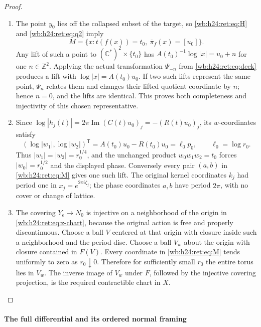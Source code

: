 \begin{proof}
\begin{enumerate}[label=\arabic*.,leftmargin=*]
\item The point \(y_0\) lies off the collapsed subset of the target, so
\eqref{wb:h24:ret:eq:H} and \eqref{wb:h24:ret:eq:q2} imply
\[
 M=\{x:t(f(x))=t_0,\ \overline\pi_f(x)=[u_0]\}.
\]
Any lift of such a point to \((\mathbb C^*)^2\times\{t_0\}\) has
\(A(t_0)^{-1}\log|x|=u_0+n\) for one \(n\in\mathbb Z^2\).
Applying the actual transformation \(\Psi_{-n}\) from
\eqref{wb:h24:ret:eq:deck} produces a lift with
\(\log|x|=A(t_0)u_0\).  If two such lifts represent the same point,
\(\Psi_n\) relates them and changes their lifted quotient coordinate
by \(n\); hence \(n=0\), and the lifts are identical.  This proves
both completeness and injectivity of this chosen representative.

\item Since
\(\log|h_j(t)|=2\pi\operatorname{Im}(C(t)u_0)_j
=-(R(t)u_0)_j\), its \(w\)-coordinates satisfy
\[
 (\log|w_1|,\log|w_2|)^{\mathsf T}
 =A(t_0)u_0-R(t_0)u_0=\ell_0p_0,
 \qquad \ell_0=\log r_0.
\]
Thus \(|w_1|=|w_2|=r_0^{1/4}\), and the unchanged product
\(w_0w_1w_2=t_0\) forces \(|w_0|=r_0^{1/2}\) and the displayed
phase.  Conversely every pair \((a,b)\) in \eqref{wb:h24:ret:eq:M} gives one
such lift.  The original kernel coordinates \(k_j\) had period one
in \(x_j=e^{2\pi i\zeta_j}\); the phase coordinates \(a,b\) have
period \(2\pi\), with no cover or change of lattice.

\item The covering \(Y_\epsilon\to N_0\) is injective on a neighborhood of
the origin in \eqref{wb:h24:ret:eq:z-chart}, because the original action is free
and properly discontinuous.  Choose a ball \(V\) centered at that
origin with closure inside such a neighborhood and the period disc.
Choose a ball \(V_w\) about the origin with closure contained in
\(F(V)\).  Every coordinate in \eqref{wb:h24:ret:eq:M} tends uniformly to zero
as \(r_0\downarrow0\).  Therefore for sufficiently small \(r_0\)
the entire torus lies in \(V_w\).  The inverse image of \(V_w\)
under \(F\), followed by the injective covering projection, is the
required contractible chart in \(X\).
\end{enumerate}
\end{proof}

\paragraph{The full differential and its ordered normal framing}

